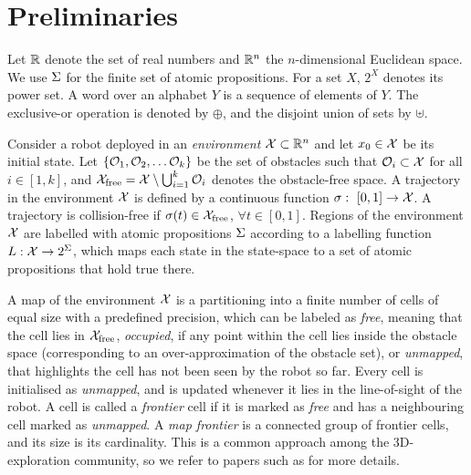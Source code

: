 \section{Preliminaries}\label{sec:prel}

Let $\mathbb{R}$ denote the set of real numbers and $\mathbb{R}^n$ the $n$-dimensional Euclidean space. 
We use $\Sigma$  for the finite set of atomic propositions.
For a set $X$, $2^X$ denotes its power set.
A word over an alphabet $Y$ is a sequence of elements of $Y$.
The exclusive-or operation is denoted by $\oplus$, and the disjoint union of sets by $\uplus$.

Consider a robot deployed in an \emph{environment} $\mathcal{X} \subset \mathbb{R}^n$ and let $x_0 \in \mathcal{X}$ be its initial state. Let $\{\mathcal{O}_1, \mathcal{O}_2, \dots \mathcal{O}_k\}$ be the set of obstacles such that $\mathcal{O}_i\subset \mathcal{X}$ for all $i \in [1,k]$, and $\mathcal{X}_{\text{free}} = \mathcal{X} \setminus \bigcup_{i=1}^{k} \mathcal{O}_i$ denotes the obstacle-free space.
A trajectory in the environment $\mathcal{X}$ is defined by a continuous function $\sigma:~[0,1] \to \mathcal{X}$. 
A trajectory is collision-free if $\sigma(t) \in \mathcal{X}_{\text{free}}$, $\forall t \in [0,1]$. 
Regions of the environment $\mathcal{X}$ are labelled with atomic propositions $\Sigma$ according to a labelling function ${L} : \mathcal{X} \rightarrow 2^{\Sigma}$, which maps each state in the state-space to a set of atomic propositions that hold true there.

A map of the environment $\mathcal{X}$ is a partitioning into a finite number of cells of equal size with a predefined precision, which can be labeled as \emph{free}, meaning that the cell lies in $\mathcal{X}_{\text{free}}$, \emph{occupied}, if any point within the cell lies inside the obstacle space (corresponding to an over-approximation of the obstacle set), or \emph{unmapped}, that highlights the cell has not been seen by the robot so far. Every cell is initialised as \emph{unmapped}, and is updated whenever it lies in the line-of-sight of the robot. A cell is called a \emph{frontier} cell if it is marked as \emph{free} and has a neighbouring cell marked as \emph{unmapped}. A \emph{map frontier} is a connected group of frontier cells, and its size is its cardinality.
This is a common approach among the 3D-exploration community, so we refer to papers such as \cite{yamauchi1997frontier,bircher2016receding} for more details.

